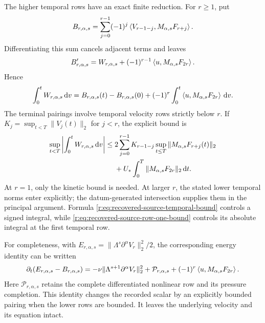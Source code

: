 The higher temporal rows have an exact finite reduction. For \(r\ge1\),
put
\[
 B_{r,\alpha,s}
 =\sum_{j=0}^{r-1}(-1)^j
   \left\langle V_{r-1-j},M_{\alpha,s}F_{r+j}\right\rangle.
\]
Differentiating this sum cancels adjacent terms and leaves
\[
 B_{r,\alpha,s}'
 =W_{r,\alpha,s}
  +(-1)^{r-1}\left\langle u,M_{\alpha,s}F_{2r}\right\rangle.
\]
Hence
\begin{equation}
 \int_0^tW_{r,\alpha,s}\,\mathrm d v
 =B_{r,\alpha,s}(t)-B_{r,\alpha,s}(0)
  +(-1)^r\int_0^t\left\langle u,M_{\alpha,s}F_{2r}\right\rangle\,\mathrm d v.
 \label{r:eq:recovered-source-temporal-telescope}
\end{equation}
The terminal pairings involve temporal velocity rows strictly below
\(r\). If \(K_j=\sup_{t<T}\|V_j(t)\|_2\) for \(j<r\), the explicit bound
is
\begin{align}
 \sup_{t<T}\left|\int_0^tW_{r,\alpha,s}\,\mathrm d v\right|
 \le{}&2\sum_{j=0}^{r-1}K_{r-1-j}
           \sup_{t\le T}\|M_{\alpha,s}F_{r+j}(t)\|_2\notag\\
 &+U_*\int_0^T\|M_{\alpha,s}F_{2r}\|_2\,\mathrm d t.
 \label{r:eq:recovered-source-temporal-bound}
\end{align}
At \(r=1\), only the kinetic bound is needed. At larger \(r\), the stated
lower temporal norms enter explicitly; the datum-generated intersection
supplies them in the principal argument. Formula
\eqref{r:eq:recovered-source-temporal-bound} controls a signed integral,
while \eqref{r:eq:recovered-source-row-one-bound} controls its absolute
integral at the first temporal row.

For completeness, with
\(E_{r,\alpha,s}=\|\Lambda^s\partial^\alpha V_r\|_2^2/2\),
the corresponding energy identity can be written
\[
 \partial_t(E_{r,\alpha,s}-B_{r,\alpha,s})
 =-\nu\|\Lambda^{s+1}\partial^\alpha V_r\|_2^2
   +\mathcal P_{r,\alpha,s}
   +(-1)^r\left\langle u,M_{\alpha,s}F_{2r}\right\rangle.
\]
Here \(\mathcal P_{r,\alpha,s}\) retains the complete differentiated
nonlinear row and its pressure completion. This identity changes the
recorded scalar by an explicitly bounded pairing when the lower rows are
bounded. It leaves the underlying velocity and its equation intact.
